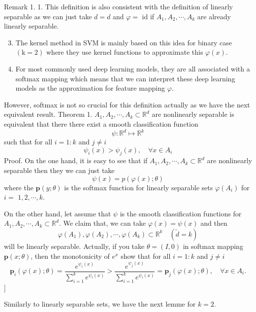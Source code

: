 \documentclass[10pt]{article}
\begin{document}
Remark 1. 1. This definition is also consistent with the definition of linearly separable as we can just take $d=d$ and $\varphi=$ id if $A_{1}, A_{2}, \cdots, A_{k}$ are already linearly separable.

  \begin{enumerate}
    \setcounter{enumii}{2}
    \item The kernel method in SVM is mainly based on this idea for binary case $(\mathrm{k}=2)$ where they use kernel functions to approximate this $\varphi(x)$.

    \item For most commonly used deep learning models, they are all associated with a softmax mapping which means that we can interpret these deep learning models as the approximation for feature mapping $\varphi$.

  \end{enumerate}
However, softmax is not so crucial for this definition actually as we have the next equivalent result. Theorem 1. $A_{1}, A_{2}, \cdots, A_{k} \subset \mathbb{R}^{d}$ are nonlinearly separable is equivalent that there there exist a smooth classification function
$$
\psi: \mathbb{R}^{d} \mapsto \mathbb{R}^{k}
$$
such that for all $i=1: k$ and $j \neq i$
$$
\psi_{i}(x)>\psi_{j}(x), \quad \forall x \in A_{i}
$$
Proof. On the one hand, it is easy to see that if $A_{1}, A_{2}, \cdots, A_{k} \subset \mathbb{R}^{d}$ are nonlinearly separable then they we can just take
$$
\psi(x)=p(\varphi(x) ; \theta)
$$
where the $\boldsymbol{p}(y ; \theta)$ is the softmax function for linearly separable sets $\varphi\left(A_{i}\right)$ for $i=$ $1,2, \cdots, k$.

On the other hand, let assume that $\psi$ is the smooth classification functions for $A_{1}, A_{2}, \cdots, A_{k} \subset \mathbb{R}^{d} .$ We claim that, we can take $\varphi(x)=\psi(x)$ and then
$$
\varphi\left(A_{1}\right), \varphi\left(A_{2}\right), \cdots, \varphi\left(A_{k}\right) \subset \mathbb{R}^{k} \quad(\tilde{d}=k)
$$
will be linearly separable. Actually, if you take $\theta=(I, 0)$ in softmax mapping $\boldsymbol{p}(x ; \theta)$, then the monotonicity of $e^{x}$ show that for all $i=1: k$ and $j \neq i$
$$
\boldsymbol{p}_{i}(\varphi(x) ; \theta)=\frac{e^{\psi_{i}(x)}}{\sum_{i=1}^{k} e^{\psi_{i}(x)}}>\frac{e^{\psi_{j}(x)}}{\sum_{i=1}^{k} e^{\psi_{i}(x)}}=\boldsymbol{p}_{j}(\varphi(x) ; \theta), \quad \forall x \in A_{i} .
$$
]

Similarly to linearly separable sets, we have the next lemme for $k=2$.
\end{document}
